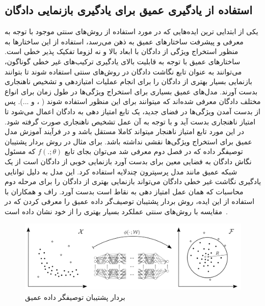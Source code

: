 \documentclass[12pt,a4paper]{report}
\begin{document}
	\subsection{استفاده از یادگیری عمیق برای یادگیری بازنمایی دادگان}
یکی از ابتدایی ترین ایده‌هایی که در مورد استفاده از روش‌های سنتی موجود با توجه به معرفی و پیشرفت ساختار‌های عمیق به ذهن می‌رسد، استفاده از این ساختار‌ها به منظور استخراج ویژگی از دادگان با ابعاد بالا و نه لزوما تفکیک پذیر خطی است. ساختار‌های عمیق با توجه به قابلیت بالای یادگیری ترکیب‌های غیر خطی گوناگون، می‌توانند به عنوان تابع نگاشت دادگان در روش‌های سنتی استفاده شوند تا بتوانند بازنمایی بسیار بهتری از دادگان را برای انجام عملیات امتیازدهی و تشخیص ناهنجاری بدست آورند.
مدل‌های عمیق بسیاری برای استخراج ویژگی‌ها در طول زمان برای انواع مختلف دادگان معرفی شده‌اند که میتوانند برای این منظور استفاده شوند
( 
،
و
...).
پس از بدست آمدن ویژگی‌ها در فضای جدید، یک تابع امتیاز دهی به دادگان اعمال می‌شود تا امتیاز ناهنجاری بدست آید و با توجه به آن عمل تشخیص ناهنجاری صورت گرفته شود. در این مورد تابع امتیاز ناهنجار میتواند کاملا مستقل باشد و در فرآیند آموزش مدل عمیق برای استخراج ویژگی‌ها نقشی نداشته باشد.
برای مثال در روش بردار پشتیبان توصیفگر داده که در فصل دوم معرفی شد می‌توان بجای تابع $f(.;\theta)$ که مسئول نگاش دادگان به فضایی معین برای بدست آورد بازنمایی خوبی از دادگان است از یک شبکه عمیق مانند مدل پرسپترون چندلایه استفاده کرد. این مدل به دلیل توانایی یادگیری نگاشت غیر خطی دادگان می‌تواند بازنمایی بهتری از دادگان را برای مرحله دوم محاسبات که همان عمل امتیاز دهی به نقاط است بدست آورد. راف و همکاران با استفاده از این ایده، روش بردار پشتیبان توصیف‌گر داده عمیق را معرفی کردن که در مقایسه با روش‌های سنتی عملکرد بسیار بهتری را از خود نشان داده است~\cite{pmlr-v80-ruff18a}.

\begin{figure}[!h]
	\begin{center}
		\includegraphics[width=\linewidth]{./images/figures/deep-svdd.png}
	\end{center}
	\caption{بردار پشتیبان توصیفگر داده عمیق~\cite{pmlr-v80-ruff18a}}
	\label{fig:deep-svdd}
	\centering
\end{figure}
\end{document}
